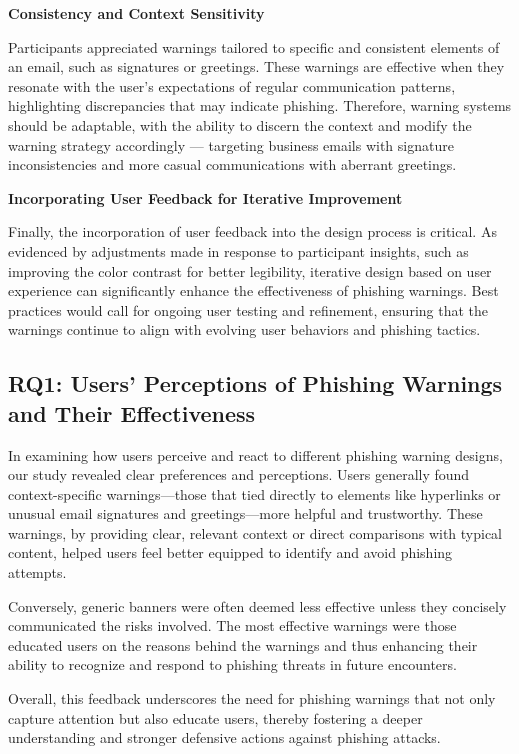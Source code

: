 \documentclass[
  a4paper,  %
  twoside,  %
  bibliography=totoc,
  headsepline,
  cleardoublepage=empty,
  parskip=half,
  draft=false
]{scrbook}
\begin{document}
\textbf{Consistency and Context Sensitivity}

Participants appreciated warnings tailored to specific and consistent elements of an email, such as signatures or greetings. These warnings are effective when they resonate with the user's expectations of regular communication patterns, highlighting discrepancies that may indicate phishing. Therefore, warning systems should be adaptable, with the ability to discern the context and modify the warning strategy accordingly — targeting business emails with signature inconsistencies and more casual communications with aberrant greetings. \newpage

\textbf{Incorporating User Feedback for Iterative Improvement}

Finally, the incorporation of user feedback into the design process is critical. As evidenced by adjustments made in response to participant insights, such as improving the color contrast for better legibility, iterative design based on user experience can significantly enhance the effectiveness of phishing warnings. Best practices would call for ongoing user testing and refinement, ensuring that the warnings continue to align with evolving user behaviors and phishing tactics.

\subsection{RQ1: Users’ Perceptions of Phishing Warnings and Their Effectiveness}
In examining how users perceive and react to different phishing warning designs, our study revealed clear preferences and perceptions. Users generally found context-specific warnings—those that tied directly to elements like hyperlinks or unusual email signatures and greetings—more helpful and trustworthy. These warnings, by providing clear, relevant context or direct comparisons with typical content, helped users feel better equipped to identify and avoid phishing attempts.

Conversely, generic banners were often deemed less effective unless they concisely communicated the risks involved. The most effective warnings were those educated users on the reasons behind the warnings and thus enhancing their ability to recognize and respond to phishing threats in future encounters.

Overall, this feedback underscores the need for phishing warnings that not only capture attention but also educate users, thereby fostering a deeper understanding and stronger defensive actions against phishing attacks.
\end{document}
